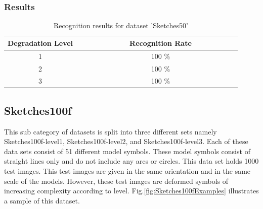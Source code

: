 \subsubsection{Results}
\begin{table}[H]
\centering
\caption{Recognition results for dataset 'Sketches50'}
\begin{tabular}{ccccccccccccccc}
  \hline
     Degradation Level & & & & & & & & Recognition Rate \\
  \hline
     1 & & & & & & & &  100 \% \\
     2 & & & & & & & &  100 \% \\
     3 & & & & & & & &  100 \% \\
  \hline
\end{tabular}
\end{table}

\vspace{49.3mm}

\subsection{Sketches100f}
This sub category of datasets is split into three different sets namely Sketches100f-level1, Sketches100f-level2, and Sketches100f-level3. Each of these data sets consist of 51 different model symbols. These model symbols consist of straight lines only and do not include any arcs or circles. This data set holds 1000 test images. This test images are given in the same orientation and in the same scale of the models. However, these test images are deformed symbols of increasing complexity according to level. Fig.\ref{fig:Sketches100fExamples} illustrates a sample of this dataset.

